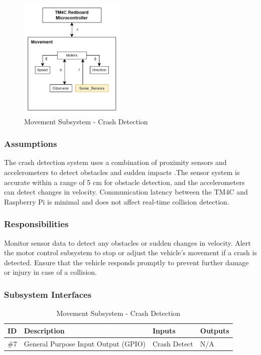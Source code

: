 \begin{figure}[h!]
	\centering
 	\includegraphics[width=0.45\textwidth]{images/movement/sonar_sensors.jpg}
 \caption{Movement Subsystem - Crash Detection} %
\end{figure}

\subsubsection{Assumptions}
The crash detection system uses a combination of proximity sensors and accelerometers to detect obstacles and sudden impacts \cite{Hassan2012}.The sensor system is accurate within a range of 5 cm for obstacle detection, and the accelerometers can detect changes in velocity. Communication latency between the TM4C and Raspberry Pi is minimal and does not affect real-time collision detection.

\subsubsection{Responsibilities}
Monitor sensor data to detect any obstacles or sudden changes in velocity. Alert the motor control subsystem to stop or adjust the vehicle's movement if a crash is detected. Ensure that the vehicle responds promptly to prevent further damage or injury in case of a collision.

\subsubsection{Subsystem Interfaces}

\begin {table}[H]
\caption {Movement Subsystem - Crash Detection} 
\begin{center}
    \begin{tabular}{ | p{1cm} | p{6cm} | p{3cm} | p{3cm} |}
    \hline
    ID & Description & Inputs & Outputs \\ \hline
    \#7 & General Purpose Input Output (GPIO) & Crash Detect & N/A \\ \hline
    \end{tabular}
\end{center}
\end{table}

\newpage
